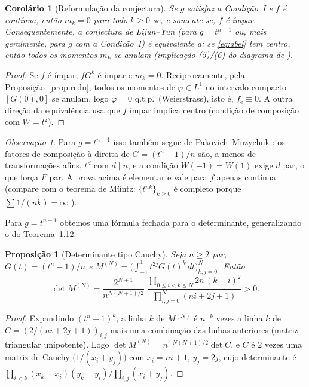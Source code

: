 \documentclass[11pt]{article}
\theoremstyle{plain}
\newtheorem{proposition}[theorem]{Proposição}
\newtheorem{corollary}[theorem]{Corolário}
\theoremstyle{definition}
\theoremstyle{remark}
\newtheorem{remark}[theorem]{Observação}
\newcommand{\fe}{f_{\mathrm e}}
\begin{document}
\begin{corollary}[Reformulação da conjectura]\label{cor:reform}
Se $g$ satisfaz a Condição~I e $f$ é contínua, então $m_k=0$ para todo $k\ge0$
se, e somente se, $f$ é ímpar. Consequentemente, a conjectura de Lijun--Yun (para
$g=t^{n-1}$ ou, mais geralmente, para $g$ com a Condição~I) é equivalente a:
\emph{se \eqref{eq:abel} tem centro, então todos os momentos $m_k$ se anulam}
(implicação (5)/(6) do diagrama de \cite[\S1.3]{ALA20}).
\end{corollary}

\begin{proof}
Se $f$ é ímpar, $fG^k$ é ímpar e $m_k=0$. Reciprocamente, pela
Proposição~\ref{prop:redu}, todos os momentos de $\varphi\in L^1$ no intervalo
compacto $[G(0),0]$ se anulam, logo $\varphi=0$ q.t.p.\ (Weierstrass), isto é,
$\fe\equiv0$. A outra direção da equivalência usa que $f$ ímpar implica centro
(condição de composição com $W=t^2$).
\end{proof}

\begin{remark}
Para $g=t^{n-1}$ isso também segue de Pakovich--Muzychuk \cite{PM09}: os fatores
de composição à direita de $G=(t^n-1)/n$ são, a menos de transformações afins,
$t^d$ com $d\mid n$, e a condição $W(-1)=W(1)$ exige $d$ par, o que força $F$
par. A prova acima é elementar e vale para $f$ apenas contínua (compare com o
teorema de Müntz: $\{t^{nk}\}_{k\ge0}$ é completo porque $\sum 1/(nk)=\infty$
\cite{BE95}).
\end{remark}

Para $g=t^{n-1}$ obtemos uma fórmula fechada para o determinante, generalizando
o do Teorema~1.12.

\begin{proposition}[Determinante tipo Cauchy]\label{prop:cauchy}
Seja $n\ge2$ par, $G(t)=(t^n-1)/n$ e
$M^{(N)}=\bigl(\int_{-1}^1t^{2j}G(t)^k\,dt\bigr)_{k,j=0}^N$. Então
\[
 \det M^{(N)}=\frac{2^{N+1}}{n^{N(N+1)/2}}\;
 \frac{\displaystyle\prod_{0\le i<k\le N}2n\,(k-i)^2}
 {\displaystyle\prod_{i,j=0}^{N}(ni+2j+1)}>0 .
\]
\end{proposition}

\begin{proof}
Expandindo $(t^n-1)^k$, a linha $k$ de $M^{(N)}$ é $n^{-k}$ vezes a linha $k$ de
$C=(2/(ni+2j+1))_{i,j}$ mais uma combinação das linhas anteriores (matriz
triangular unipotente). Logo $\det M^{(N)}=n^{-N(N+1)/2}\det C$, e $C$ é $2$ vezes
uma matriz de Cauchy $\bigl(1/(x_i+y_j)\bigr)$ com $x_i=ni+1$, $y_j=2j$, cujo
determinante é $\prod_{i<k}(x_k-x_i)(y_k-y_i)/\prod_{i,j}(x_i+y_j)$.
\end{proof}
\end{document}
